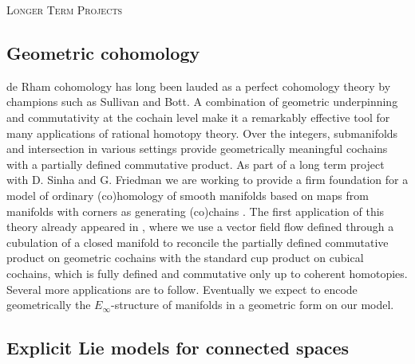 \vspace*{6pt} \noindent \textsc{Longer Term Projects}

\subsection{Geometric cohomology} \label{ss:geometric cohomology}

de Rham cohomology has long been lauded as a perfect cohomology theory by champions such as Sullivan and Bott.
A combination of geometric underpinning and commutativity at the cochain level make it a remarkably effective tool for many applications of rational homotopy theory.
Over the integers, submanifolds and intersection in various settings provide geometrically meaningful cochains with a partially defined commutative
product.
As part of a long term project with D. Sinha and G. Friedman we are working to provide a firm foundation for a model of ordinary (co)homology of smooth manifolds based on maps from manifolds with corners as generating (co)chains \cite{medina2021foundations}.
The first application of this theory already appeared in \cite{medina2021flowing}, where we use a vector field flow defined through a cubulation of a closed manifold to reconcile the partially defined commutative product on geometric cochains with the standard cup product on cubical cochains, which is fully defined and commutative only up to coherent homotopies.
Several more applications are to follow.
Eventually we expect to encode geometrically the $E_\infty$-structure of manifolds in a geometric form on our model.

\subsection{Explicit Lie models for connected spaces} \label{ss:lie models}

